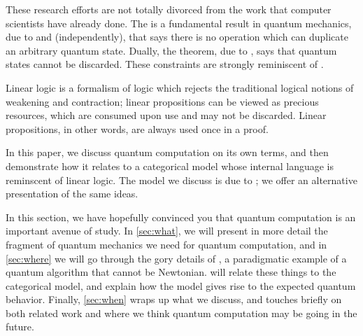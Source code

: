 These research efforts are not totally divorced from the work that computer
scientists have already done.  The  is a fundamental
result in quantum mechanics, due to  and
 (independently), that says there is no operation which can
duplicate an arbitrary quantum state.  Dually, the  theorem,
due to , says that quantum states cannot be discarded.  These
constraints are strongly reminiscent of .

Linear logic is a formalism of logic which rejects the traditional logical
notions of weakening and contraction; linear propositions can be viewed as
precious resources, which are consumed upon use and may not be discarded.
Linear propositions, in other words, are always used once in a proof.

In this paper, we discuss quantum computation on its own terms, and then
demonstrate how it relates to a categorical model whose internal language is
reminscent of linear logic.  The model we discuss is due to ; we offer an alternative presentation of
the same ideas.

In this section, we have hopefully convinced you that quantum computation is an
important avenue of study.  In \cref{sec:what}, we will present in more detail
the fragment of quantum mechanics we need for quantum computation, and in
\cref{sec:where} we will go through the gory details of , a paradigmatic example of a quantum algorithm that cannot be
Newtonian.   will relate these things to the categorical model,
and explain how the model gives rise to the expected quantum behavior.  Finally,
\cref{sec:when} wraps up what we discuss, and touches briefly on both related
work and where we think quantum computation may be going in the future.
